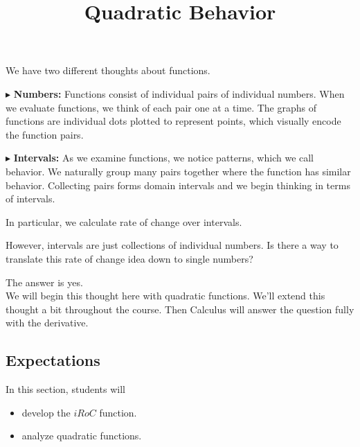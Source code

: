 \documentclass{ximera}
\title{Quadratic Behavior}
\begin{document}
\begin{abstract}
\end{abstract}
\maketitle







We have two different thoughts about functions.


$\blacktriangleright$ \textbf{Numbers:}  Functions consist of individual pairs of individual numbers.  When we evaluate functions, we think of each pair one at a time.  The graphs of functions are individual dots plotted to represent points, which visually encode the function pairs. 







$\blacktriangleright$ \textbf{Intervals:} As we examine functions, we notice patterns, which we call behavior. We naturally group many pairs together where the function has similar behavior.  Collecting pairs forms domain intervals and we begin thinking in terms of intervals.





In particular, we calculate rate of change over intervals. 


However, intervals are just collections of individual numbers.  Is there a way to translate this rate of change idea down to single numbers?

The answer is yes.  \\


We will begin this thought here with quadratic functions. We'll extend this thought a bit throughout the course. Then Calculus will answer the question fully with the derivative.













\subsection{Expectations}

\begin{sectionOutcomes}
In this section, students will 

\begin{itemize}
\item develop the $iRoC$ function.
\item analyze quadratic functions.
\end{itemize}
\end{sectionOutcomes}
\end{document}
